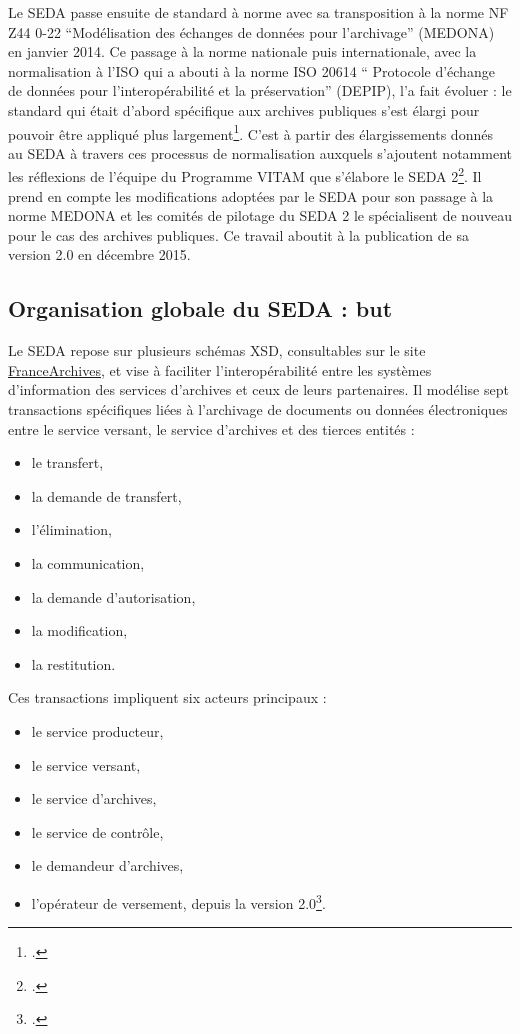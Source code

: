 Le \gls{SEDA} passe ensuite de standard à norme avec sa transposition à la norme NF Z44 0-22 \enquote{Modélisation des échanges de données pour l’archivage} (MEDONA) en janvier 2014. Ce passage à la norme nationale puis internationale, avec la normalisation à l'ISO qui a abouti à la norme ISO 20614 \enquote{ Protocole d'échange de données pour l'interopérabilité et la préservation} (DEPIP), l’a fait évoluer : le standard qui était d’abord spécifique aux archives publiques s’est élargi pour pouvoir être appliqué plus largement\footcite{b2c_dstandard_2018}. C’est à partir des élargissements donnés au \gls{SEDA} à travers ces processus de normalisation auxquels s'ajoutent notamment les réflexions de l'équipe du Programme \gls{VITAM} que s’élabore le \gls{SEDA} 2\footcite{jacobson_standard_2014}. Il prend en compte les modifications adoptées par le \gls{SEDA} pour son passage à la norme MEDONA et les comités de pilotage du \gls{SEDA} 2 le spécialisent de nouveau pour le cas des archives publiques. Ce travail aboutit à la publication de sa version 2.0 en décembre 2015.


\subsection{Organisation globale du SEDA : but}

Le \gls{SEDA} repose sur plusieurs schémas \gls{XSD}, consultables sur le site \href{https://francearchives.gouv.fr/seda/2.2/documentation/html/seda-2.2-main.html }{FranceArchives}, et vise à faciliter l’interopérabilité entre les systèmes d’information des services d’archives et ceux de leurs partenaires. Il modélise sept transactions spécifiques liées à l'archivage de documents ou données électroniques entre le service versant, le service d’archives et des tierces entités : 
\begin{itemize}
	\item le transfert, 
	\item la demande de transfert, 
	\item l’élimination, 
	\item la communication, 
	\item la demande d’autorisation, 
	\item la modification,
	\item la restitution. 
\end{itemize}


Ces transactions impliquent six acteurs principaux : 
\begin{itemize}
	\item le service producteur, 
	\item le service versant, 
	\item le service d'archives, 
	\item le service de contrôle, 
	\item le demandeur d'archives, 
	\item l'opérateur de versement, depuis la version 2.0\footcite[pp.34-35]{dieng_qualite_2020}.
\end{itemize}


